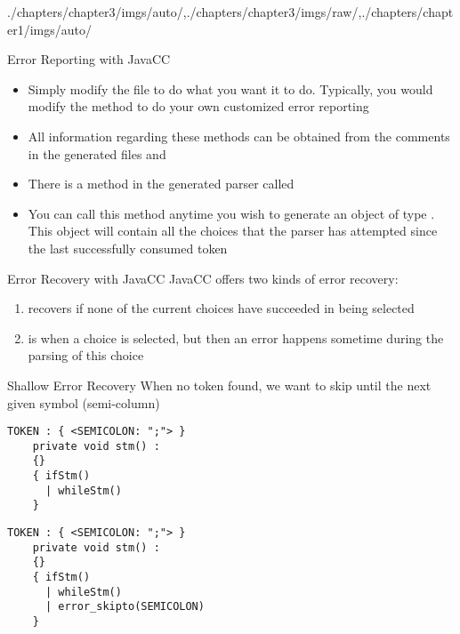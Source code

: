 \begin{graphicspathcontext}{{./chapters/chapter3/imgs/auto/},{./chapters/chapter3/imgs/raw/},{./chapters/chapter1/imgs/auto/}}
\begin{bibunit}[apalike]
\begin{frame}{Error Reporting with JavaCC}
	\begin{itemize}
	\item Simply modify the file  to do what you want it to do. Typically, you would modify the  method to do your own customized error reporting
	\item All information regarding these methods can be obtained from the comments in the generated files  and 
	\vfill
	\item There is a method in the generated parser called 
	\item You can call this method anytime you wish to generate an object of type . This object will contain all the choices that the parser has attempted since the last successfully consumed token
	\end{itemize}
\end{frame}

\begin{frame}{Error Recovery with JavaCC}
	JavaCC offers two kinds of error recovery:
	\vfill
	\begin{enumerate}
	\item[Shallow recovery] recovers if none of the current choices have succeeded in being selected
	\vfill
	\item[Deep recovery] is when a choice is selected, but then an error happens sometime during the parsing of this choice
	\end{enumerate}
\end{frame}

\begin{frame}[t,fragile]{Shallow Error Recovery}
	When no token found, we want to skip until the next given symbol (semi-column) \\
	\begin{lstlisting}[style=lststyle-java]
	TOKEN : { <SEMICOLON: ";"> }
	private void stm() :
	{}
	{ ifStm()
	  | whileStm()
	}
	\end{lstlisting}
	\begin{center}\end{center}
	\begin{lstlisting}[style=lststyle-java]
	TOKEN : { <SEMICOLON: ";"> }
	private void stm() :
	{}
	{ ifStm()
	  | whileStm()
	  | error_skipto(SEMICOLON)
	}
	\end{lstlisting}
\end{frame}


\end{bibunit}
\end{graphicspathcontext}
